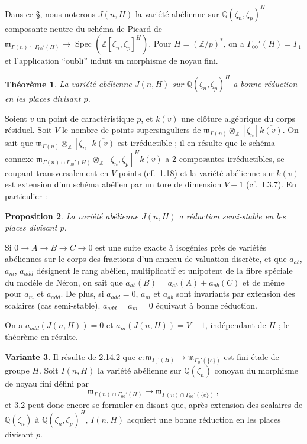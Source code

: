 \documentclass[10pt,a4paper]{amsart}
\theoremstyle{plain}
\newtheorem{theorem}{Th\'eor\`eme}[section]
\newtheorem{proposition}[theorem]{Proposition}
\theoremstyle{definition}
\newtheorem{variante}[theorem]{Variante}
\DeclareMathOperator{\Spec}{Spec}
\newcommand{\m}{\mathfrak{m}}
\newcommand{\ZZ}{\mathbb{Z}}
\newcommand{\QQ}{\mathbb{Q}}
\begin{document}
Dans ce \S, nous noterons $J(n,H)$ la vari\'et\'e ab\'elienne sur $\QQ(\zeta_n,\zeta_p)^H$ composante neutre du sch\'ema de Picard de $\m_{\Gamma(n) \cap \Gamma_{00}'(H)} \to \Spec(\ZZ[\zeta_n,\zeta_p]^H)$. Pour $H = (\ZZ/p)^*$, on a $\Gamma_{00}'(H) = \Gamma_1$ et l'application ``oubli'' induit un morphisme de noyau fini.

\setcounter{theorem}{1}
\begin{theorem}
La vari\'et\'e ab\'elienne $J(n,H)$ sur $\QQ(\zeta_n,\zeta_p)^H$ a bonne r\'eduction en les places divisant $p$.
\end{theorem}

Soient $v$ un point de caract\'eristique $p$, et $\overline{k(v)}$ une cl\^oture alg\'ebrique du corps r\'esiduel. Soit $V$ le nombre de points supersinguliers de $\m_{\Gamma(n)} \otimes_\ZZ[\zeta_n] \overline{k(v)}$. On sait que $\m_{\Gamma(n)} \otimes_\ZZ[\zeta_n] \overline{k(v)}$ est irr\'eductible ; il en r\'esulte que le sch\'ema connexe $\m_{\Gamma(n) \cap \Gamma_{00}'(H)} \otimes_\ZZ[\zeta_n,\zeta_p]^H \overline{k(v)}$ a 2 composantes irr\'eductibles, se coupant transversalement en $V$ points (cf.\ 1.18) et la vari\'et\'e ab\'elienne sur $\overline{k(v)}$ est extension d'un sch\'ema ab\'elien par un tore de dimension $V-1$ (cf.\ I.3.7). En particulier :

\setcounter{theorem}{2}
\begin{proposition}
La vari\'et\'e ab\'elienne $J(n,H)$ a r\'eduction semi-stable en les places divisant $p$.
\end{proposition}

Si $0 \to A \to B \to C \to 0$ est une suite exacte \`a isog\'enies pr\`es de vari\'et\'es ab\'eliennes sur le corps des fractions d'un anneau de valuation discr\`ete, et que $a_{ab}$, $a_m$, $a_{add}$ d\'esignent le rang ab\'elien, multiplicatif et unipotent de la fibre sp\'eciale du mod\'ele de N\'eron, on sait que $a_{ab}(B) = a_{ab}(A) + a_{ab}(C)$ et de m\^eme pour $a_m$ et $a_{add}$. De plus, si $a_{add} = 0$, $a_m$ et $a_{ab}$ sont invariants par extension des scalaires (cas semi-stable). $a_{add} = a_m = 0$ \'equivaut \`a bonne r\'eduction.

On a $a_{add}(J(n,H)) = 0$ et $a_m(J(n,H)) = V-1$, ind\'ependant de $H$ ; le th\'eor\`eme en r\'esulte.

\begin{variante}
Il r\'esulte de 2.14.2 que $c : \m_{\Gamma_0'(H)} \to \m_{\Gamma_0'(\{e\})}$ est fini \'etale de groupe $H$. Soit $I(n,H)$ la vari\'et\'e ab\'elienne sur $\QQ(\zeta_n)$ conoyau du morphisme de noyau fini d\'efini par
\[
\m_{\Gamma(n) \cap \Gamma_{00}'(H)} \to \m_{\Gamma(n) \cap \Gamma_{00}'(\{e\})}\ ,
\]
et 3.2 peut donc encore se formuler en disant que, apr\`es extension des scalaires de $\QQ(\zeta_n)$ \`a $\QQ(\zeta_n,\zeta_p)^H$, $I(n,H)$ acquiert une bonne r\'eduction en les places divisant $p$.
\end{variante}
\end{document}
